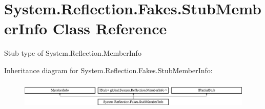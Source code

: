 \hypertarget{class_system_1_1_reflection_1_1_fakes_1_1_stub_member_info}{\section{System.\-Reflection.\-Fakes.\-Stub\-Member\-Info Class Reference}
\label{class_system_1_1_reflection_1_1_fakes_1_1_stub_member_info}
}


Stub type of System.\-Reflection.\-Member\-Info 


Inheritance diagram for System.\-Reflection.\-Fakes.\-Stub\-Member\-Info\-:\begin{figure}[H]
\begin{center}
\leavevmode
\includegraphics[height=1.328588cm]{class_system_1_1_reflection_1_1_fakes_1_1_stub_member_info}
\end{center}
\end{figure}
